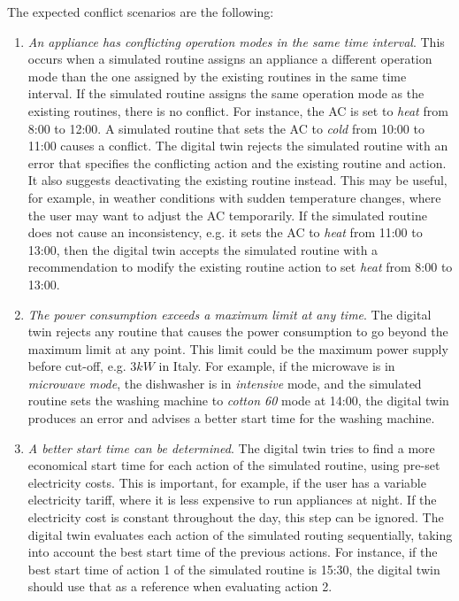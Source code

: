 The expected conflict scenarios are the following:
\begin{enumerate}[label={\textit{S\arabic*.}}, leftmargin=3.5em]
    \item \textit{An appliance has conflicting operation modes in the same time interval}. This occurs when a simulated routine assigns an appliance a different operation mode than the one assigned by the existing routines in the same time interval. If the simulated routine assigns the same operation mode as the existing routines, there is no conflict. For instance, the AC is set to \textit{heat} from 8:00 to 12:00. A simulated routine that sets the AC to \textit{cold} from 10:00 to 11:00 causes a conflict. The digital twin rejects the simulated routine with an error that specifies the conflicting action and the existing routine and action. It also suggests deactivating the existing routine instead. This may be useful, for example, in weather conditions with sudden temperature changes, where the user may want to adjust the AC temporarily. If the simulated routine does not cause an inconsistency, e.g. it sets the AC to \textit{heat} from 11:00 to 13:00, then the digital twin accepts the simulated routine with a recommendation to modify the existing routine action to set \textit{heat} from 8:00 to 13:00.

    \item \textit{The power consumption exceeds a maximum limit at any time}. The digital twin rejects any routine that causes the power consumption to go beyond the maximum limit at any point. This limit could be the maximum power supply before cut-off, e.g. $3kW$ in Italy. For example, if the microwave is in \textit{microwave mode}, the dishwasher is in \textit{intensive} mode, and the simulated routine sets the washing machine to \textit{cotton 60} mode at 14:00, the digital twin produces an error and advises a better start time for the washing machine.

    \item \textit{A better start time can be determined}. The digital twin tries to find a more economical start time for each action of the simulated routine, using pre-set electricity costs. This is important, for example, if the user has a variable electricity tariff, where it is less expensive to run appliances at night. If the electricity cost is constant throughout the day, this step can be ignored. The digital twin evaluates each action of the simulated routing sequentially, taking into account the best start time of the previous actions. For instance, if the best start time of action 1 of the simulated routine is 15:30, the digital twin should use that as a reference when evaluating action 2.


\end{enumerate}
